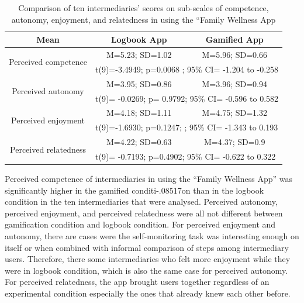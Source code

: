 \begin{table}[h!]
  \begin{center}
    \caption{Comparison of ten intermediaries' scores on sub-scales of competence, autonomy, enjoyment, and relatedness in using the ``Family Wellness App}
    \label{table:imiwellnessinterm}
	\begin{tabular}{|c|c|c|}
		\hline
		Mean &Logbook App&Gamified App\\
		\hline
		 \multirow{2}{*}{Perceived competence}&M=5.23; SD=1.02&M=5.96; SD=0.66\\\cline{2-3} 

		 &\multicolumn{2}{|l|}{t(9)=-3.4949; p=0.0068 ; 95\% CI= -1.204 to -0.258} \\
\hline
		 \multirow{2}{*}{Perceived autonomy}&M=3.95; SD=0.86&M=3.96; SD=0.94\\\cline{2-3} 

		 &\multicolumn{2}{|l|}{t(9)= -0.0269; p= 0.9792; 95\% CI= -0.596 to 0.582} \\
\hline
		 \multirow{2}{*}{Perceived enjoyment}&M=4.18; SD=1.11&M=4.75; SD=1.32\\\cline{2-3} 

		 &\multicolumn{2}{|l|}{t(9)=-1.6930;  p=0.1247; ; 95\% CI= -1.343 to 0.193 } \\
\hline
		 \multirow{2}{*}{Perceived relatedness}&M=4.22; SD=0.63&M=4.37; SD=0.9\\\cline{2-3} 
		 &\multicolumn{2}{|l|}{t(9)= -0.7193; p=0.4902; 95\% CI= -0.622 to 0.322 } \\
\hline
	\end{tabular}
  \end{center}
\end{table}
\newline
Perceived competence of intermediaries in using the ``Family Wellness App'' was significantly higher in the gamified conditi-.08517on than in the logbook condition in the ten intermediaries that were analysed. Perceived autonomy, perceived enjoyment, and perceived relatedness were all not different between gamification condition and logbook condition. For perceived enjoyment and autonomy, there are cases were the self-monitoring task was interesting enough on itself or when combined with informal comparison of steps among intermediary users. Therefore, there some intermediaries who felt more enjoyment while they were in logbook condition, which is also the same case for perceived autonomy. For perceived relatedness, the app brought users together regardless of an experimental condition especially the ones that already knew each other before.  \newline
